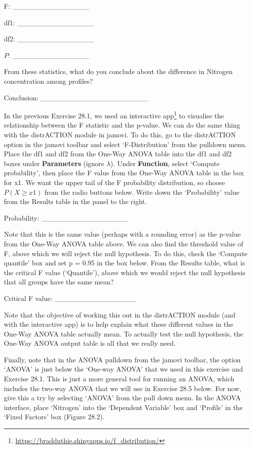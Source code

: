 \documentclass[
  openany]{krantz}
\renewcommand{\href}[2]{#2\footnote{\url{#1}}}
\begin{document}
F: \_\_\_\_\_\_\_\_\_\_\_\_\_\_\_

df1: \_\_\_\_\_\_\_\_\_\_\_\_\_\_\_

df2: \_\_\_\_\_\_\_\_\_\_\_\_\_\_\_

\(P\): \_\_\_\_\_\_\_\_\_\_\_\_\_\_\_

From these statistics, what do you conclude about the difference in Nitrogen concentration among profiles?

Conclusion: \_\_\_\_\_\_\_\_\_\_\_\_\_\_\_\_\_\_\_\_\_

In the previous Exercise 28.1, we used an \href{https://bradduthie.shinyapps.io/f_distribution/}{interactive app} to visualise the relationship between the F statistic and the p-value.
We can do the same thing with the distrACTION module in jamovi.
To do this, go to the distrACTION option in the jamovi toolbar and select `F-Distribution' from the pulldown menu.
Place the df1 and df2 from the One-Way ANOVA table into the df1 and df2 boxes under \textbf{Parameters} (ignore \(\lambda\)).
Under \textbf{Function}, select `Compute probability', then place the F value from the One-Way ANOVA table in the box for x1.
We want the upper tail of the F probability distribution, so choose \(P(X \geq x1)\) from the radio buttons below.
Write down the `Probability' value from the Results table in the panel to the right.

Probability: \_\_\_\_\_\_\_\_\_\_\_\_\_\_\_\_\_

Note that this is the same value (perhaps with a rounding error) as the p-value from the One-Way ANOVA table above.
We can also find the threshold value of F, above which we will reject the null hypothesis.
To do this, check the `Compute quantile' box and set p = 0.95 in the box below.
From the Results table, what is the critical F value (`Quantile'), above which we would reject the null hypothesis that all groups have the same mean?

Critical F value: \_\_\_\_\_\_\_\_\_\_\_\_\_\_\_\_

Note that the objective of working this out in the distrACTION module (and with the interactive app) is to help explain what these different values in the One-Way ANOVA table actually mean.
To actually test the null hypothesis, the One-Way ANOVA output table is all that we really need.

Finally, note that in the ANOVA pulldown from the jamovi toolbar, the option `ANOVA' is just below the `One-way ANOVA' that we used in this exercise and Exercise 28.1.
This is just a more general tool for running an ANOVA, which includes the two-way ANOVA that we will use in Exercise 28.5 below.
For now, give this a try by selecting `ANOVA' from the pull down menu.
In the ANOVA interface, place `Nitrogen' into the `Dependent Variable' box and `Profile' in the `Fixed Factors' box (Figure 28.2).
\end{document}
